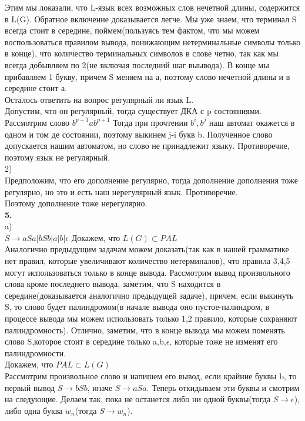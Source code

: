 \documentclass[a4paper,12pt]{article}
\begin{document}
Этим мы локазали, что L-язык всех возможных слов нечетной длины, содержится в L(G). Обратное включение доказывается легче. Мы уже знаем, что терминал S всегда стоит в середине, поймем(пользуясь тем фактом, что мы можем воспользоваться правилом вывода, понижающим нетерминальные символы только в конце), что количество терминальных символов в слове четно, так как мы всегда добывляем по 2(не включая последний шаг выывода). В конце мы прибавляем 1 букву, причем S меняем на а, поэтому слово нечетной длины и в середине стоит а.\\
Осталось ответить на вопрос регулярный ли язык L.\\
Допустим, что он регулярный, тогда существует ДКА с p состояниями. Рассмотрим слово $b^{p+1}ab^{p+1}$ Тогда при прочтении $b^i,b^j$ наш автомат окажется в одном и том де состоянии, поэтому выкинем j-i букв b. Полученное слово допускается нашим автоматом, но слово не принадлежит языку. Противоречие, поэтому язык не регулярный.\\
2)\\
Предположим, что его дополнение регулярно, тогда дополнение дополнения тоже регулярно, но это и есть наш нерегулярный язык. Противоречие.\\
Поэтому дополнение тоже нерегулярно.\\
\textbf{5.}\\
a)\\
$S\rightarrow aSa|bSb|a|b|\epsilon$
Докажем, что $L(G)\subset PAL$\\
Аналогично предыдущим задачам можем доказать(так как в нашей грамматике нет правил, которые увеличивают количество нетерминалов), что правила 3,4,5 могут использоваться только в конце вывода. Рассмотрим вывод произвольного слова кроме последнего вывода, заметим, что S находится в середине(доказывается аналогично предыдущей задаче), причем, если выкинуть S, то слово будет палиндромом(в начале вывода оно пустое-палиндром, в процессе вывода мы можем использовать только 1,2 правило, которые сохраняют палиндромность). Отлично, заметим, что в конце вывода мы можем поменять слово S,которое стоит в середине только a,b,$\epsilon$, которые тоже не изменят его палиндромности.\\
Докажем, что $PAL \subset L(G)$ \\
Рассмотрим произвольное слово и напишем его вывод, если крайние буквы b, то первый вывод $S\rightarrow bSb$, иначе $S\rightarrow aSa$. Теперь откидываем эти буквы и смотрим на следующие. Делаем так, пока не останется либо ни одной буквы(тогда $S\rightarrow \epsilon$), либо одна буква $w_n$(тогда $S\rightarrow w_n$).\\
\end{document}
